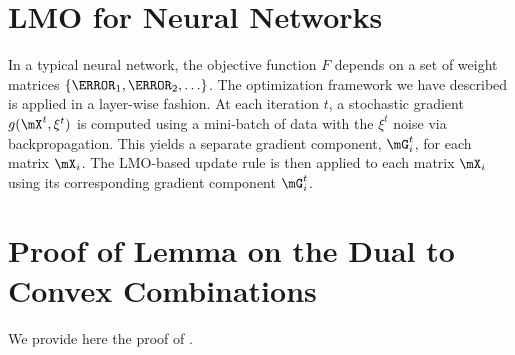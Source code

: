 \documentclass[pmlr]{jmlr}%
\begin{document}
 
 
 \appendix
 \section{LMO for Neural Networks}\label{sec:lmo_for_nn}
 
 In a typical neural network, the objective function $F$ depends on a set of weight matrices $\{ \mW_1, \mW_2, \ldots \}$. The optimization framework we have described is applied in a layer-wise fashion. At each iteration $t$, a stochastic gradient $g(\mX^t, \xi^t)$ is computed using a mini-batch of data with the $\xi^t$ noise via backpropagation. This yields a separate gradient component, $\mG_i^t$, for each matrix $\mX_i$. The LMO-based update rule is then applied to each matrix $\mX_i$ using its corresponding gradient component $\mG_i^t$.
 
 \section{Proof of Lemma on the Dual to Convex Combinations}\label{sec:proof_dual_conv_comb}
 
 We provide here the proof of .
 
\end{document}
